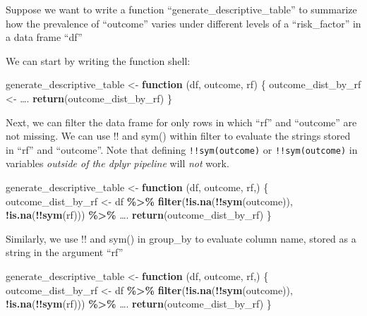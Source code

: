 \documentclass[
]{book}
\newenvironment{Shaded}{\begin{snugshade}}{\end{snugshade}}
\newcommand{\ControlFlowTok}[1]{\textcolor[rgb]{0.13,0.29,0.53}{\textbf{#1}}}
\newcommand{\FunctionTok}[1]{\textcolor[rgb]{0.13,0.29,0.53}{\textbf{#1}}}
\newcommand{\NormalTok}[1]{#1}
\newcommand{\OtherTok}[1]{\textcolor[rgb]{0.56,0.35,0.01}{#1}}
\newcommand{\SpecialCharTok}[1]{\textcolor[rgb]{0.81,0.36,0.00}{\textbf{#1}}}
\begin{document}
Suppose we want to write a function ``generate\_descriptive\_table'' to summarize how the prevalence of ``outcome'' varies under different levels of a ``risk\_factor'' in a data frame ``df''

We can start by writing the function shell:

\begin{Shaded}
\begin{Highlighting}[]
\NormalTok{generate\_descriptive\_table }\OtherTok{\textless{}{-}} \ControlFlowTok{function}\NormalTok{ (df, outcome, rf) \{}
\NormalTok{outcome\_dist\_by\_rf }\OtherTok{\textless{}{-}}\NormalTok{ ….}
\FunctionTok{return}\NormalTok{(outcome\_dist\_by\_rf)}
\NormalTok{\}}
\end{Highlighting}
\end{Shaded}

Next, we can filter the data frame for only rows in which ``rf'' and ``outcome'' are not missing. We can use !! and sym() within filter to evaluate the strings stored in ``rf'' and ``outcome''. Note that defining \texttt{!!sym(outcome)} or \texttt{!!sym(outcome)} in variables \emph{outside of the dplyr pipeline} will \emph{not} work.

\begin{Shaded}
\begin{Highlighting}[]
\NormalTok{generate\_descriptive\_table }\OtherTok{\textless{}{-}} \ControlFlowTok{function}\NormalTok{ (df, outcome, rf,) \{}
\NormalTok{  outcome\_dist\_by\_rf }\OtherTok{\textless{}{-}}\NormalTok{ df }\SpecialCharTok{\%\textgreater{}\%} 
  \FunctionTok{filter}\NormalTok{(}\SpecialCharTok{!}\FunctionTok{is.na}\NormalTok{(}\SpecialCharTok{!!}\FunctionTok{sym}\NormalTok{(outcome)), }\SpecialCharTok{!}\FunctionTok{is.na}\NormalTok{(}\SpecialCharTok{!!}\FunctionTok{sym}\NormalTok{(rf))) }\SpecialCharTok{\%\textgreater{}\%}
\NormalTok{  ….}
  \FunctionTok{return}\NormalTok{(outcome\_dist\_by\_rf)}
\NormalTok{\}}
\end{Highlighting}
\end{Shaded}

Similarly, we use !! and sym() in group\_by to evaluate column name, stored as a string in the argument ``rf''

\begin{Shaded}
\begin{Highlighting}[]
\NormalTok{generate\_descriptive\_table }\OtherTok{\textless{}{-}} \ControlFlowTok{function}\NormalTok{ (df, outcome, rf,) \{}
\NormalTok{  outcome\_dist\_by\_rf }\OtherTok{\textless{}{-}}\NormalTok{ df }\SpecialCharTok{\%\textgreater{}\%} 
  \FunctionTok{filter}\NormalTok{(}\SpecialCharTok{!}\FunctionTok{is.na}\NormalTok{(}\SpecialCharTok{!!}\FunctionTok{sym}\NormalTok{(outcome)), }\SpecialCharTok{!}\FunctionTok{is.na}\NormalTok{(}\SpecialCharTok{!!}\FunctionTok{sym}\NormalTok{(rf))) }\SpecialCharTok{\%\textgreater{}\%}
\NormalTok{  ….}
  \FunctionTok{return}\NormalTok{(outcome\_dist\_by\_rf)}
\NormalTok{\}}
\end{Highlighting}
\end{Shaded}
\end{document}
